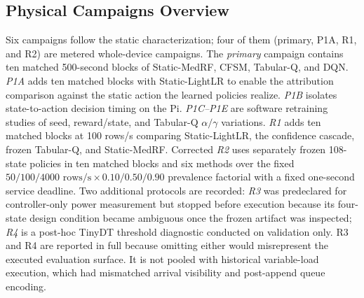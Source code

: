 \subsection{Physical Campaigns Overview}
Six campaigns follow the static characterization; four of them (primary, P1A, R1, and R2) are metered whole-device campaigns. The \emph{primary} campaign contains ten matched 500-second blocks of Static-MedRF, CFSM, Tabular-Q, and DQN. \emph{P1A} adds ten matched blocks with Static-LightLR to enable the attribution comparison against the static action the learned policies realize. \emph{P1B} isolates state-to-action decision timing on the Pi. \emph{P1C--P1E} are software retraining studies of seed, reward/state, and Tabular-Q $\alpha/\gamma$ variations. \emph{R1} adds ten matched blocks at 100 rows/s comparing Static-LightLR, the confidence cascade, frozen Tabular-Q, and Static-MedRF. Corrected \emph{R2} uses separately frozen 108-state policies in ten matched blocks and six methods over the fixed $50/100/4000\text{ rows/s}\times 0.10/0.50/0.90$ prevalence factorial with a fixed one-second service deadline. Two additional protocols are recorded: \emph{R3} was predeclared for controller-only power measurement but stopped before execution because its four-state design condition became ambiguous once the frozen artifact was inspected; \emph{R4} is a post-hoc TinyDT threshold diagnostic conducted on validation only. R3 and R4 are reported in full because omitting either would misrepresent the executed evaluation surface. It is not pooled with historical variable-load execution, which had mismatched arrival visibility and post-append queue encoding.
